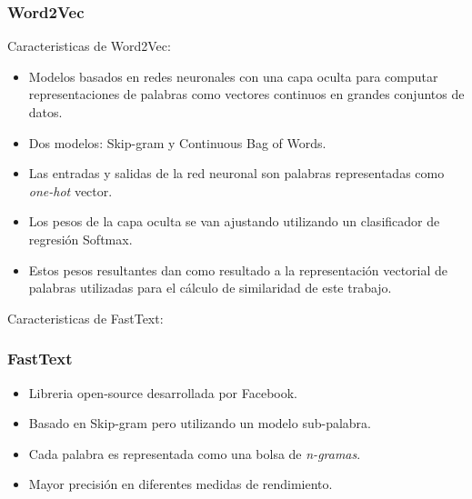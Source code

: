 \begin{frame}
	\frametitle{Word2Vec}
	Caracteristicas de Word2Vec:
	\bigskip
	\begin{itemize}[<*>]
		\item Modelos basados en redes neuronales con una capa oculta para computar representaciones de palabras como vectores continuos en grandes conjuntos de datos.
		\item Dos modelos: Skip-gram y Continuous Bag of Words.
		\item Las entradas y salidas de la red neuronal son palabras representadas como \textit{one-hot} vector.
		\item Los pesos de la capa oculta se van ajustando utilizando un clasificador de regresión Softmax.
		\item Estos pesos resultantes dan como resultado a la representación vectorial de palabras utilizadas para el cálculo de similaridad de este trabajo.
	\end{itemize}
\end{frame}

\begin{frame}
	Caracteristicas de FastText:
	\bigskip
	\frametitle{FastText}
	\begin{itemize}[<*>]
		\item Libreria open-source desarrollada por Facebook.
		\item Basado en Skip-gram pero utilizando un modelo sub-palabra.
		\item Cada palabra es representada como una bolsa de \textit{n-gramas}.
		\item Mayor precisión en diferentes medidas de rendimiento.
	\end{itemize}
\end{frame}

